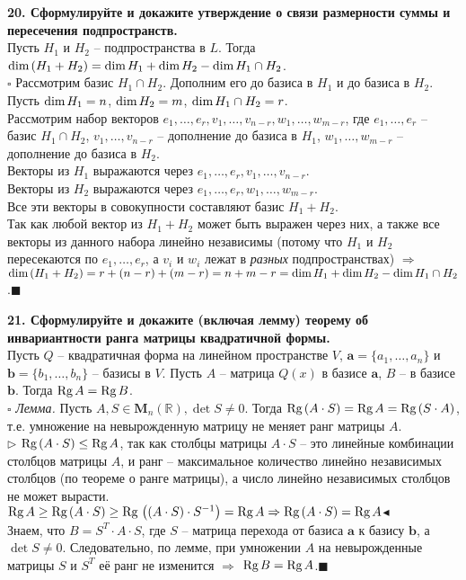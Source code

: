 \documentclass[11pt,a4paper]{article}
\newcommand{\R}{\mathbb{R}}
\renewcommand{\a}{\mathbf{a}}
\renewcommand{\b}{\mathbf{b}}
\newcommand{\Rg}[1]{\mathrm{Rg}\hspace{0.5mm}#1}
\newcommand{\Dim}[1]{\mathrm{dim}\hspace{0.5mm}#1}
\newcommand{\proof}{$\square$ }
\newcommand{\qed}{\hfill$\blacksquare$}
\begin{document}
\textbf{20. Сформулируйте и докажите утверждение о связи размерности суммы и пересечения подпространств.\\}
Пусть $H_1$ и $H_2$ -- подпространства в $L$. Тогда $\Dim{(H_1 + H_2)} = \Dim{H_1} + \Dim{H_2} - \Dim{H_1 \cap H_2}$.\\
\proof Рассмотрим базис $H_1 \cap H_2$. Дополним его до базиса в $H_1$ и до базиса в $H_2$.\\
Пусть $\Dim{H_1} = n$, $\Dim{H_2} = m$, $\Dim{H_1 \cap H_2} = r$.\\
Рассмотрим набор векторов $e_1, \hdots, e_r, v_1, \hdots, v_{n - r}, w_1, \hdots, w_{m - r}$, где $e_1, \hdots, e_r$ -- базис $H_1 \cap H_2$, $v_1, \hdots, v_{n - r}$ -- дополнение до базиса в $H_1$, $w_1, \hdots, w_{m - r}$ -- дополнение до базиса в $H_2$.\\
Векторы из $H_1$ выражаются через $e_1, \hdots, e_r, v_1, \hdots, v_{n - r}$.\\
Векторы из $H_2$ выражаются через $e_1, \hdots, e_r, w_1, \hdots, w_{m - r}$.\\
Все эти векторы в совокупности составляют базис $H_1 + H_2$.\\
Так как любой вектор из $H_1 + H_2$ может быть выражен через них, а также все векторы из данного набора линейно независимы (потому что $H_1$ и $H_2$ пересекаются по $e_1, \hdots, e_r$, а $v_i$ и $w_i$ лежат в \textit{разных} подпространствах) $\Rightarrow$ $\Dim{(H_1 + H_2)} = r + (n - r) + (m - r) = n + m - r = \Dim{H_1} + \Dim{H_2} - \Dim{H_1 \cap H_2}$.\qed

\textbf{21. Сформулируйте и докажите (включая лемму) теорему об инвариантности ранга матрицы квадратичной формы.\\}
Пусть $Q$ -- квадратичная форма на линейном пространстве $V$, $\a = \{a_1, \hdots, a_n\}$ и $\b = \{b_1, \hdots, b_n\}$ -- базисы в $V$. Пусть $A$ -- матрица $Q(x)$ в базисе $\a$, $B$ -- в базисе $\b$. Тогда $\Rg{A} = \Rg{B}$.\\
\proof \textit{Лемма.} Пусть $A, S \in \mathbf{M}_n( \R ), \det S \neq 0$. Тогда $\Rg{(A \cdot S)} = \Rg{A} = \Rg{(S \cdot A)}$, т.е. умножение на невырожденную матрицу не меняет ранг матрицы $A$.\\
$\triangleright$ $\Rg{(A \cdot S)} \leq \Rg{A}$, так как столбцы матрицы $A \cdot S$ -- это линейные комбинации столбцов матрицы $A$, и ранг -- максимальное количество линейно независимых столбцов (по теореме о ранге матрицы), а число линейно независимых столбцов не может вырасти.\\
$\Rg{A} \geq \Rg{(A \cdot S)} \geq \Rg{\left( (A \cdot S) \cdot S^{-1} \right) } = \Rg{A} \Rightarrow \Rg{(A \cdot S)} = \Rg{A}$\hfill$\blacktriangleleft$\\
Знаем, что $B = S^T \cdot A \cdot S$, где $S$ -- матрица перехода от базиса $\a$ к базису $\b$, а $\det S \neq 0$. Следовательно, по лемме, при умножении $A$ на невырожденные матрицы $S$ и $S^T$ её ранг не изменится $\Rightarrow$ $\Rg{B} = \Rg{A}$.\qed
\end{document}
